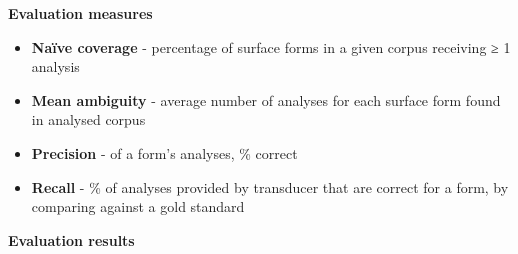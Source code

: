 \documentclass[a0paper,fontscale=0.3]{baposter}  %
\newcommand{\htwo}[1]{{\htwofont \textbf{\dotfill{}#1\dotfill{}}}}
\begin{document}
\begin{poster}
{%
			\htwo{Evaluation measures}
			\begin{itemize}
				\item \textbf{Naïve coverage} - percentage of surface forms in a given corpus receiving ≥ 1 analysis%
				\item \textbf{Mean ambiguity} - average number of analyses for each surface form found in analysed corpus
				\item \textbf{Precision} - of a form's analyses, \% correct
				\item \textbf{Recall} - \% of analyses provided by transducer that are correct for a form, by comparing against a gold standard
			\end{itemize}
			\htwo{Evaluation results}

}
\end{poster}
\end{document}
